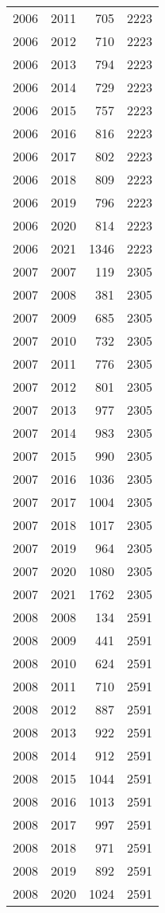 \documentclass[
  10pt,
  letterpaper,
  DIV=11,
  numbers=noendperiod,
  twoside]{scrartcl}
\begin{document}
\begin{longtable}[]{@{}rrrr@{}}
2006 & 2011 & 705 & 2223 \\
2006 & 2012 & 710 & 2223 \\
2006 & 2013 & 794 & 2223 \\
2006 & 2014 & 729 & 2223 \\
2006 & 2015 & 757 & 2223 \\
2006 & 2016 & 816 & 2223 \\
2006 & 2017 & 802 & 2223 \\
2006 & 2018 & 809 & 2223 \\
2006 & 2019 & 796 & 2223 \\
2006 & 2020 & 814 & 2223 \\
2006 & 2021 & 1346 & 2223 \\
2007 & 2007 & 119 & 2305 \\
2007 & 2008 & 381 & 2305 \\
2007 & 2009 & 685 & 2305 \\
2007 & 2010 & 732 & 2305 \\
2007 & 2011 & 776 & 2305 \\
2007 & 2012 & 801 & 2305 \\
2007 & 2013 & 977 & 2305 \\
2007 & 2014 & 983 & 2305 \\
2007 & 2015 & 990 & 2305 \\
2007 & 2016 & 1036 & 2305 \\
2007 & 2017 & 1004 & 2305 \\
2007 & 2018 & 1017 & 2305 \\
2007 & 2019 & 964 & 2305 \\
2007 & 2020 & 1080 & 2305 \\
2007 & 2021 & 1762 & 2305 \\
2008 & 2008 & 134 & 2591 \\
2008 & 2009 & 441 & 2591 \\
2008 & 2010 & 624 & 2591 \\
2008 & 2011 & 710 & 2591 \\
2008 & 2012 & 887 & 2591 \\
2008 & 2013 & 922 & 2591 \\
2008 & 2014 & 912 & 2591 \\
2008 & 2015 & 1044 & 2591 \\
2008 & 2016 & 1013 & 2591 \\
2008 & 2017 & 997 & 2591 \\
2008 & 2018 & 971 & 2591 \\
2008 & 2019 & 892 & 2591 \\
2008 & 2020 & 1024 & 2591 \\

\end{longtable}
\end{document}

